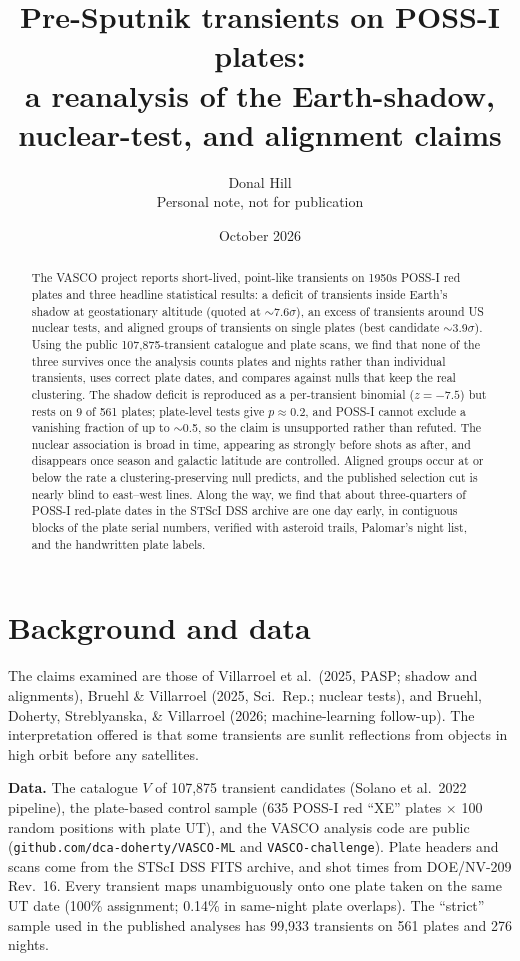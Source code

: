 \documentclass[11pt,a4paper]{article}
\title{\textbf{Pre-Sputnik transients on POSS-I plates:\\a reanalysis of the Earth-shadow, nuclear-test, and alignment claims}}
\author{Donal Hill\\\small Personal note, not for publication}
\date{October 2026}
\begin{document}
\maketitle

\begin{abstract}
\noindent
The VASCO project reports short-lived, point-like transients on 1950s POSS-I red plates and three headline statistical
results: a deficit of transients inside Earth's shadow at geostationary altitude (quoted at $\sim$7.6$\sigma$), an excess
of transients around US nuclear tests, and aligned groups of transients on single plates (best candidate $\sim$3.9$\sigma$).
Using the public 107,875-transient catalogue and plate scans, we find that none of the three survives once the
analysis counts plates and nights rather than individual transients, uses correct plate dates, and compares against nulls
that keep the real clustering. The shadow deficit is reproduced as a per-transient binomial ($z=-7.5$) but rests on 9 of
561 plates; plate-level tests give $p\approx0.2$, and POSS-I cannot exclude a vanishing fraction of up to $\sim$0.5, so the
claim is unsupported rather than refuted. The nuclear association is broad in time, appearing as strongly before shots as
after, and disappears once season and galactic latitude are controlled. Aligned groups occur at or below the rate a
clustering-preserving null predicts, and the published selection cut is nearly blind to east--west lines. Along the way,
we find that about three-quarters of POSS-I red-plate dates in the STScI DSS archive are one day early, in contiguous
blocks of the plate serial numbers, verified with asteroid trails, Palomar's night list, and the handwritten plate labels.
\end{abstract}

\section{Background and data}

The claims examined are those of Villarroel et al.\ (2025, PASP; shadow and alignments), Bruehl \& Villarroel (2025,
Sci.\ Rep.; nuclear tests), and Bruehl, Doherty, Streblyanska, \& Villarroel (2026; machine-learning follow-up). The
interpretation offered is that some transients are sunlit reflections from objects in high orbit before any satellites.

\textbf{Data.} The catalogue $V$ of 107,875 transient candidates (Solano et al.\ 2022 pipeline), the plate-based
control sample (635 POSS-I red ``XE'' plates $\times$ 100 random positions with plate UT), and the VASCO analysis code are
public (\texttt{github.com/dca-doherty/VASCO-ML} and \texttt{VASCO-challenge}). Plate headers and scans come from
the STScI DSS FITS archive, and shot times from DOE/NV-209 Rev.~16. Every transient maps unambiguously onto one plate taken
on the same UT date (100\% assignment; 0.14\% in same-night plate overlaps). The ``strict'' sample used in the published
analyses has 99,933 transients on 561 plates and 276 nights.
\end{document}
